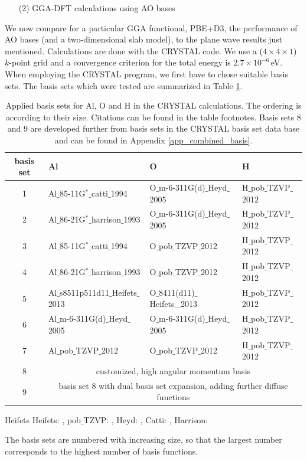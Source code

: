 \documentclass[11pt,DIV=13,BCOR=5mm,a4paper,headinclude]{scrbook}
\renewcommand{\vec}[1]{\underline{#1}}
\begin{document}
\begin{enumerate}
 \item[(2)] GGA-DFT calculations using AO bases
\end{enumerate}
We now compare for a particular GGA functional, PBE+D3, the performance of AO bases (and a two-dimensional slab model), to the plane wave results just mentioned.
Calculations are done with the CRYSTAL code.
We use a ($4\times 4 \times 1$) $\vec{k}$-point grid and a convergence criterion for the total energy is $2.7\times 10^{-6}\,$eV.
When employing the CRYSTAL program, we first have to chose suitable basis sets.
The basis sets which were tested are summarized in Table \ref{tab:basissets}.
\begin{table}[!h]
  \centering
   \caption{Applied basis sets for Al, O and H in the CRYSTAL calculations.
   The ordering is according to their size.
   Citations can be found in the table footnotes.
   Basis sets 8 and 9 are developed further from basis sets in the CRYSTAL basis set data base and can be found in Appendix \ref{app_combined_basis}.}
  \begin{tabular}{c|lll}
  \toprule
  basis set & Al & O & H \\\midrule
   1&Al$\_$85-11G$^\ast\_$catti$\_$1994 &O$\_$m-6-311G(d)$\_$Heyd$\_$2005 & H$\_$pob$\_$TZVP$\_$2012\\
   2&Al$\_$86-21G$^\ast\_$harrison$\_$1993 &O$\_$m-6-311G(d)$\_$Heyd$\_$2005 & H$\_$pob$\_$TZVP$\_$2012\\
   3&Al$\_$85-11G$^\ast\_$catti$\_$1994 &O$\_$pob$\_$TZVP$\_$2012 & H$\_$pob$\_$TZVP$\_$2012\\
   4&Al$\_$86-21G$^\ast\_$harrison$\_$1993 &O$\_$pob$\_$TZVP$\_$2012 & H$\_$pob$\_$TZVP$\_$2012\\
   5&Al$\_$s8511p511d11$\_$Heifets$\_$2013 & O$\_$8411(d11)$\_$Heifets\_2013&H$\_$pob$\_$TZVP$\_$2012 \\
   6&Al$\_$m-6-311G(d)$\_$Heyd$\_$2005 &O$\_$m-6-311G(d)$\_$Heyd$\_$2005 & H$\_$pob$\_$TZVP$\_$2012\\
   7&Al$\_$pob$\_$TZVP$\_$2012 &O$\_$pob$\_$TZVP$\_$2012 & H$\_$pob$\_$TZVP$\_$2012\\
   8&\multicolumn{3}{c}{customized, high angular momentum basis} \\
   9&\multicolumn{3}{c}{basis set 8 with dual basis set expansion, adding further diffuse functions}\\\bottomrule
  \end{tabular}
  \begin{tablenotes}
 \footnotesize
\item[Heifets] Heifets: \cite{heifets}, pob$\_$TZVP: \cite{pobTZVP}, Heyd: \cite{heyd1,heyd2}, Catti: \cite{catti}, Harrison: \cite{harrison1,harrison2}
\end{tablenotes}
  \label{tab:basissets}
\end{table}
The basis sets are numbered with increasing size, so that the largest number corresponds to the highest number of basis functions.
\end{document}
